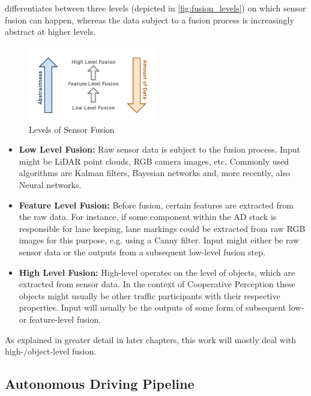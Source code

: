 \cite{Chen2019} differentiates between three levels (depicted in \autoref{fig:fusion_levels}) on which sensor fusion can happen, whereas the data subject to a fusion process is increasingly abstract at higher levels. 

\begin{figure}[H]
	\centering
	\includegraphics[width=0.5\textwidth]{98_images/fusion_levels.png}
	\caption{Levels of Sensor Fusion}
	\label{fig:fusion_levels}
\end{figure}

\begin{itemize}
	\item \textbf{Low Level Fusion:} Raw sensor data is subject to the fusion process. Input might be LiDAR point clouds, RGB camera images, etc. Commonly used algorithms are Kalman filters, Bayesian networks and, more recently, also Neural networks.
	\item \textbf{Feature Level Fusion:} Before fusion, certain features are extracted from the raw data. For instance, if some component within the AD stack is responsible for lane keeping, lane markings could be extracted from raw RGB images for this purpose, e.g. using a Canny filter. Input might either be raw sensor data or the outputs from a subsequent low-level fusion step.
	\item \textbf{High Level Fusion:} High-level operates on the level of objects, which are extracted from sensor data. In the context of Cooperative Perception these objects might usually be other traffic participants with their respective properties. Input will usually be the outputs of some form of subsequent low- or feature-level fusion.
\end{itemize}

As explained in greater detail in later chapters, this work will mostly deal with high-/object-level fusion. 


\subsection{Autonomous Driving Pipeline}
\label{subsec:background:autonomous_driving_pipeline}

